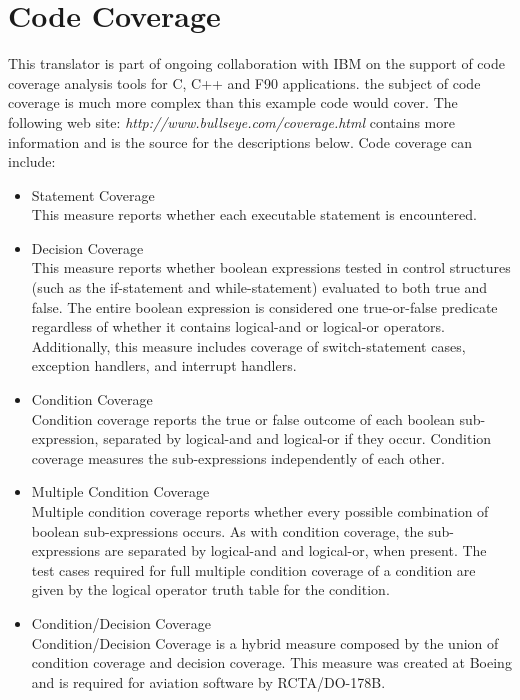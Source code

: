 \chapter{Code Coverage}

   This translator is part of ongoing collaboration with IBM on the support of code
coverage analysis tools for C, C++ and F90 applications.  the subject of code coverage is
much more complex than this example code would cover.  The following web site:
{\em http://www.bullseye.com/coverage.html} contains more information and is the source 
for the descriptions below. Code coverage can include:
\begin{itemize}
   \item Statement Coverage \\
      This measure reports whether each executable statement is encountered.
   \item Decision Coverage \\
      This measure reports whether boolean expressions tested in control structures 
      (such as the if-statement and while-statement) evaluated to both true and false. 
      The entire boolean expression is considered one true-or-false predicate regardless 
      of whether it contains logical-and or logical-or operators. Additionally, this
      measure includes coverage of switch-statement cases, exception handlers, and
      interrupt handlers.
   \item Condition Coverage \\
      Condition coverage reports the true or false outcome of each boolean sub-expression, 
      separated by logical-and and logical-or if they occur. Condition coverage measures 
      the sub-expressions independently of each other.
   \item Multiple Condition Coverage \\
      Multiple condition coverage reports whether every possible combination of boolean 
      sub-expressions occurs. As with condition coverage, the sub-expressions are
      separated by logical-and and logical-or, when present. The test cases required for 
      full multiple condition coverage of a condition are given by the logical operator
      truth table for the condition.
   \item Condition/Decision Coverage \\
      Condition/Decision Coverage is a hybrid measure composed by the union of condition
      coverage and decision coverage. This measure was created at Boeing and is required 
      for aviation software by RCTA/DO-178B.

\end{itemize}
